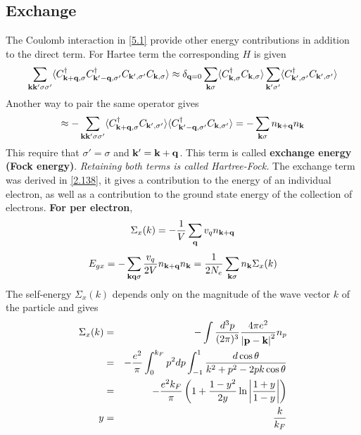 \subsection{Exchange}
The Coulomb interaction in \eqref{5.1} provide other energy contributions in addition to the direct term.
For Hartee term the corresponding $H$ is given
\begin{equation}
    \sum_{\mathbf{k} \mathbf{k}' \sigma \sigma'} \langle C^\dagger_{\mathbf{k}+\mathbf{q},\sigma} C^\dagger_{\mathbf{k}'-\mathbf{q},\sigma'} C_{\mathbf{k}',\sigma'} C_{\mathbf{k},\sigma} \rangle \approx \delta_{\mathbf{q} = 0} \sum_{\mathbf{k}\sigma} \langle C^\dagger_{\mathbf{k},\sigma} C_{\mathbf{k},\sigma} \rangle \sum_{\mathbf{k}'\sigma'} \langle C^\dagger_{\mathbf{k}',\sigma'} C_{\mathbf{k}',\sigma'} \rangle
\end{equation}
Another way to pair the same operator gives
\begin{equation}
    \approx - \sum_{\mathbf{k}\mathbf{k}'\sigma\sigma'} \langle C^\dagger_{\mathbf{k}+\mathbf{q},\sigma} C_{\mathbf{k}',\sigma'} \rangle \langle C^\dagger_{\mathbf{k}'-\mathbf{q},\sigma'} C_{\mathbf{k},\sigma'} \rangle = - \sum_{\mathbf{k}\sigma} n_{\mathbf{k}+\mathbf{q}} n_{\mathbf{k}}
\end{equation}
This require that $\sigma' =\sigma$ and $\mathbf{k}' = \mathbf{k} + \mathbf{q}$.
This term is called \textbf{exchange energy (Fock energy)}.
\textit{Retaining both terms is called Hartree-Fock.}
The exchange term was derived in \eqref{2.138}, it gives a contribution to the energy of an individual electron, as well as a contribution to the ground state energy of the collection of electrons. \textbf{For per electron},
\begin{equation}
    \Sigma_x(k) = - \frac{1}{V} \sum_{\mathbf{q}} v_q n_{\mathbf{k}+\mathbf{q}}    \label{5.11}
\end{equation}
\begin{equation}
    E_{gx} = - \sum_{\mathbf{k}\mathbf{q}\sigma} \frac{v_q}{2V}   n_{\mathbf{k}+\mathbf{q}} n_{\mathbf{k}} =\frac{1}{2N_e} \sum_{\mathbf{k}\sigma} n_{\mathbf{k}} \Sigma_x(k)  \label{5.12}
\end{equation}
The self-energy $\Sigma_x(k)$ depends only on the magnitude of the wave vector $k$ of the particle and gives
\begin{eqnarray}
    \Sigma_x(k) &=& - \int \frac{d^3 p}{(2\pi)^3} \frac{4\pi e^2}{\abs{\mathbf{p} -\mathbf{k}}^2} n_p \nonumber \\
    &=& - \frac{e^2}{\pi}  \int_0^{k_F} p^2 dp \int_{-1}^{1} \frac{d \cos\theta}{k^2+p^2 -2pk\cos\theta} \nonumber \\
    &=& - \frac{e^2 k_F}{\pi}  \left( 1+ \frac{1-y^2}{2y} \ln \abs{\frac{1+y}{1-y}}  \right) \label{5.16} \\
    y &=& \frac{k}{k_F} \label{5.17}
\end{eqnarray}

